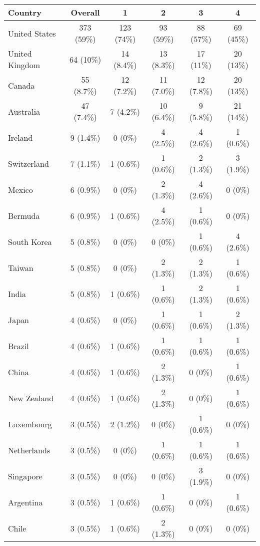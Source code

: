 \documentclass[12pt]{article}
\begin{document}
\begin{table}
    \centering

    \footnotesize{
    \begin{tabular}{lccccc}
    \toprule
    Country & Overall & 1 & 2 & 3 & 4\\
    \midrule
    United States & 373 (59\%) & 123 (74\%) & 93 (59\%) & 88 (57\%) & 69 (45\%)\\
    United Kingdom & 64 (10\%) & 14 (8.4\%) & 13 (8.3\%) & 17 (11\%) & 20 (13\%)\\
    Canada & 55 (8.7\%) & 12 (7.2\%) & 11 (7.0\%) & 12 (7.8\%) & 20 (13\%)\\
    Australia & 47 (7.4\%) & 7 (4.2\%) & 10 (6.4\%) & 9 (5.8\%) & 21 (14\%)\\
    Ireland & 9 (1.4\%) & 0 (0\%) & 4 (2.5\%) & 4 (2.6\%) & 1 (0.6\%)\\
    Switzerland & 7 (1.1\%) & 1 (0.6\%) & 1 (0.6\%) & 2 (1.3\%) & 3 (1.9\%)\\
    Mexico & 6 (0.9\%) & 0 (0\%) & 2 (1.3\%) & 4 (2.6\%) & 0 (0\%)\\
    Bermuda & 6 (0.9\%) & 1 (0.6\%) & 4 (2.5\%) & 1 (0.6\%) & 0 (0\%)\\
    South Korea & 5 (0.8\%) & 0 (0\%) & 0 (0\%) & 1 (0.6\%) & 4 (2.6\%)\\
    Taiwan & 5 (0.8\%) & 0 (0\%) & 2 (1.3\%) & 2 (1.3\%) & 1 (0.6\%)\\
    India & 5 (0.8\%) & 1 (0.6\%) & 1 (0.6\%) & 2 (1.3\%) & 1 (0.6\%)\\
    Japan & 4 (0.6\%) & 0 (0\%) & 1 (0.6\%) & 1 (0.6\%) & 2 (1.3\%)\\
    Brazil & 4 (0.6\%) & 1 (0.6\%) & 1 (0.6\%) & 1 (0.6\%) & 1 (0.6\%)\\
    China & 4 (0.6\%) & 1 (0.6\%) & 2 (1.3\%) & 0 (0\%) & 1 (0.6\%)\\
    New Zealand & 4 (0.6\%) & 1 (0.6\%) & 2 (1.3\%) & 0 (0\%) & 1 (0.6\%)\\
    Luxembourg & 3 (0.5\%) & 2 (1.2\%) & 0 (0\%) & 1 (0.6\%) & 0 (0\%)\\
    Netherlands & 3 (0.5\%) & 0 (0\%) & 1 (0.6\%) & 1 (0.6\%) & 1 (0.6\%)\\
    Singapore & 3 (0.5\%) & 0 (0\%) & 0 (0\%) & 3 (1.9\%) & 0 (0\%)\\
    Argentina & 3 (0.5\%) & 1 (0.6\%) & 1 (0.6\%) & 0 (0\%) & 1 (0.6\%)\\
    Chile & 3 (0.5\%) & 1 (0.6\%) & 2 (1.3\%) & 0 (0\%) & 0 (0\%)\\

\end{tabular}}
\end{table}
\end{document}
